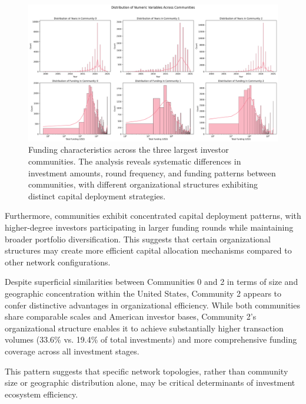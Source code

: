 
\begin{figure}[htbp]
\centering
\includegraphics[width=1\textwidth]{../figures/us/numeric_variables_distribution.png}
\caption{Funding characteristics across the three largest investor communities. The analysis reveals systematic differences in investment amounts, round frequency, and funding patterns between communities, with different organizational structures exhibiting distinct capital deployment strategies.}
\label{fig:funding_characteristics}
\end{figure}


Furthermore, communities exhibit concentrated capital deployment patterns, with higher-degree investors participating in larger funding rounds while maintaining broader portfolio diversification. This suggests that certain organizational structures may create more efficient capital allocation mechanisms compared to other network configurations.

Despite superficial similarities between Communities 0 and 2 in terms of size and geographic concentration within the United States, Community 2 appears to confer distinctive advantages in organizational efficiency. While both communities share comparable scales and American investor bases, Community 2's organizational structure enables it to achieve substantially higher transaction volumes (33.6\% vs. 19.4\% of total investments) and more comprehensive funding coverage across all investment stages. 

This pattern suggests that specific network topologies, rather than community size or geographic distribution alone, may be critical determinants of investment ecosystem efficiency.


